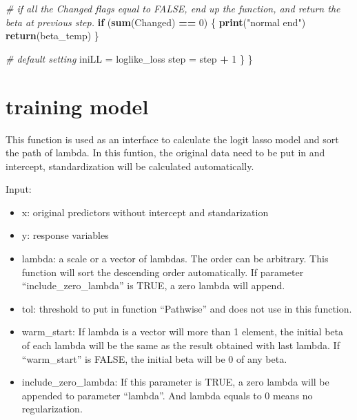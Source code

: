 \documentclass[
]{article}
\newenvironment{Shaded}{\begin{snugshade}}{\end{snugshade}}
\newcommand{\CommentTok}[1]{\textcolor[rgb]{0.56,0.35,0.01}{\textit{#1}}}
\newcommand{\ControlFlowTok}[1]{\textcolor[rgb]{0.13,0.29,0.53}{\textbf{#1}}}
\newcommand{\DecValTok}[1]{\textcolor[rgb]{0.00,0.00,0.81}{#1}}
\newcommand{\FunctionTok}[1]{\textcolor[rgb]{0.13,0.29,0.53}{\textbf{#1}}}
\newcommand{\NormalTok}[1]{#1}
\newcommand{\OtherTok}[1]{\textcolor[rgb]{0.56,0.35,0.01}{#1}}
\newcommand{\SpecialCharTok}[1]{\textcolor[rgb]{0.81,0.36,0.00}{\textbf{#1}}}
\newcommand{\StringTok}[1]{\textcolor[rgb]{0.31,0.60,0.02}{#1}}
\begin{document}
\begin{Shaded}
\begin{Highlighting}[]
    \CommentTok{\# if all the Changed flags equal to FALSE, end up the function, and return the beta at previous step.}
    \ControlFlowTok{if}\NormalTok{ (}\FunctionTok{sum}\NormalTok{(Changed) }\SpecialCharTok{==} \DecValTok{0}\NormalTok{) \{}
      \FunctionTok{print}\NormalTok{(}\StringTok{"normal end"}\NormalTok{)}
      \FunctionTok{return}\NormalTok{(beta\_temp)}
\NormalTok{    \}}
    
    \CommentTok{\# default setting}
\NormalTok{    iniLL }\OtherTok{=}\NormalTok{ loglike\_loss}
\NormalTok{    step }\OtherTok{=}\NormalTok{ step }\SpecialCharTok{+} \DecValTok{1}
\NormalTok{  \}}
\NormalTok{\}}
\end{Highlighting}
\end{Shaded}

\hypertarget{training-model}{%
\section{training model}\label{training-model}}

This function is used as an interface to calculate the logit lasso model
and sort the path of lambda. In this funtion, the original data need to
be put in and intercept, standardization will be calculated
automatically.

Input:

\begin{itemize}
\item
  x: original predictors without intercept and standarization
\item
  y: response variables
\item
  lambda: a scale or a vector of lambdas. The order can be arbitrary.
  This function will sort the descending order automatically. If
  parameter ``include\_zero\_lambda'' is TRUE, a zero lambda will
  append.
\item
  tol: threshold to put in function ``Pathwise'' and does not use in
  this function.
\item
  warm\_start: If lambda is a vector will more than 1 element, the
  initial beta of each lambda will be the same as the result obtained
  with last lambda. If ``warm\_start'' is FALSE, the initial beta will
  be 0 of any beta.
\item
  include\_zero\_lambda: If this parameter is TRUE, a zero lambda will
  be appended to parameter ``lambda''. And lambda equals to 0 means no
  regularization.
\end{itemize}
\end{document}
